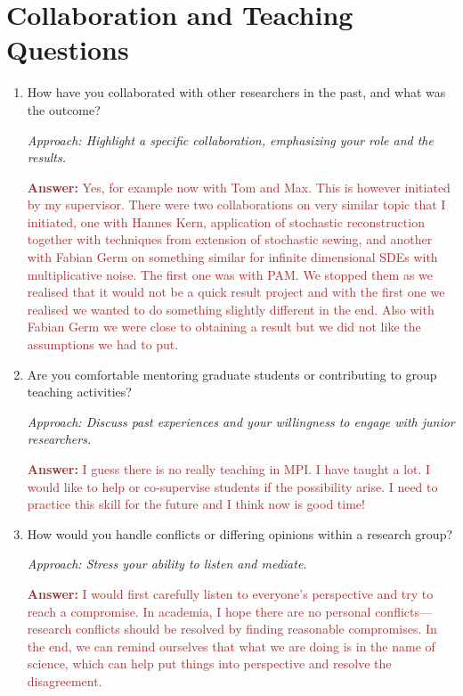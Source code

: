 \documentclass[12pt]{article}
\numberwithin{equation}{section}
\newcommand{\brown}[1]{\textcolor{brown}{#1}}
\begin{document}
\section{Collaboration and Teaching Questions}
\begin{enumerate}
    \item How have you collaborated with other researchers in the past, and what was the outcome?
    
    \textit{Approach: Highlight a specific collaboration, emphasizing your role and the results.}

    \brown{\textbf{Answer:} Yes, for example now with Tom and Max. This is however initiated by my supervisor. There were two collaborations on very similar topic that I initiated, one with Hannes Kern, application of stochastic reconstruction together with techniques from extension of stochastic sewing, and another with Fabian Germ on something similar for infinite dimensional SDEs with multiplicative noise. The first one was with PAM. We stopped them as we realised that it would not be a quick result project and with the first one we realised we wanted to do something slightly different in the end. Also with Fabian Germ we were close to obtaining a result but we did not like the assumptions we had to put.}
    
    \item Are you comfortable mentoring graduate students or contributing to group teaching activities?
    
    \textit{Approach: Discuss past experiences and your willingness to engage with junior researchers.}

    \brown{\textbf{Answer:} I guess  there is no really teaching in MPI. I have taught a lot. I would like to help or co-supervise students if the possibility arise. I need to practice this skill for the future and I think now is good time!}

    \item How would you handle conflicts or differing opinions within a research group?
    
    \textit{Approach: Stress your ability to listen and mediate.}

    \brown{\textbf{Answer:} I would first carefully listen to everyone's perspective and try to reach a compromise. In academia, I hope there are no personal conflicts—research conflicts should be resolved by finding reasonable compromises. In the end, we can remind ourselves that what we are doing is in the name of science, which can help put things into perspective and resolve the disagreement.}


\end{enumerate}
\end{document}
